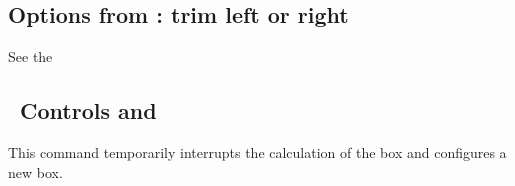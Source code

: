 \subsection{Options from \TIKZ: trim left or right}

See the 

\subsection{\TIKZ\ Controls  and }

This command temporarily interrupts the calculation of the box and configures a
new box.

\begin{tkzexample}[latex=8cm,small]
\end{tkzexample}

\endinput
